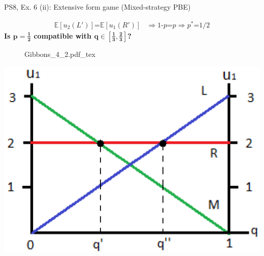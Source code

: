 \begin{frame}{PS8, Ex. 6 (ii): Extensive form game (Mixed-strategy PBE)}
\begin{multicols}{2}
      \begin{align*}
        \mathbb{E}[u_2(L')]\text{=}\mathbb{E}[u_1(R')]&\Rightarrow \text{1-}p\text{=}p\Rightarrow p^*\text{=}1/2
      \end{align*}
      \textbf{Is $\bm{p=\frac{1}{2}}$ compatible with $\bm{q\in\left[\frac{1}{3},\frac{2}{3}\right]}$?}
      \vfill\null\columnbreak
      \begin{figure}[!h]
        \center {}
        {Gibbons_4_2.pdf_tex}
      \end{figure}
      \includegraphics[width=1.1\columnwidth]{figures/Gibbons_4_2_E[u]}
      \vfill\null
    \end{multicols}
\end{frame}
